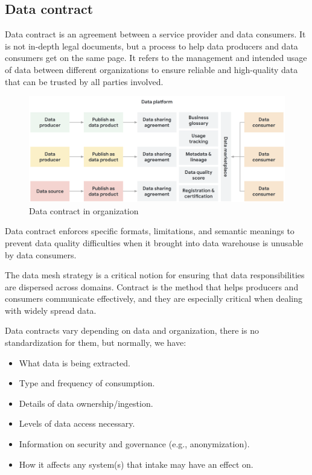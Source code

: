 \documentclass[12pt, a4paper]{book}
\begin{document}
\subsection{Data contract}
Data contract is an agreement between a service provider and data consumers. It is not in-depth legal documents, but a process to help data producers and data consumers get on the same page. It refers to the management and intended usage of data between different organizations to ensure reliable and high-quality data that can be trusted by all parties involved. \cite{contract}

\begin{figure}[h]
	\begin{framed}
		\centering
		\includegraphics[width=13cm]{datacontract.png}
		\caption{Data contract in organization}
		\label{datacontract}
	\end{framed}
\end{figure}

Data contract enforces specific formats, limitations, and semantic meanings to prevent data quality difficulties when it brought into data warehouse is unusable by data consumers.

The data mesh strategy is a critical notion for ensuring that data responsibilities are dispersed across domains. Contract is the method that helps producers and consumers communicate effectively, and they are especially critical when dealing with widely spread data.

Data contracts vary depending on data and organization, there is no standardization for them, but normally, we have:
	\begin{itemize}[nosep]
		\item What data is being extracted.
		\item Type and frequency of consumption.
		\item Details of data ownership/ingestion.
		\item Levels of data access necessary.
		\item Information on security and governance (e.g., anonymization).
		\item How it affects any system(s) that intake may have an effect on.
	\end{itemize}
\end{document}
